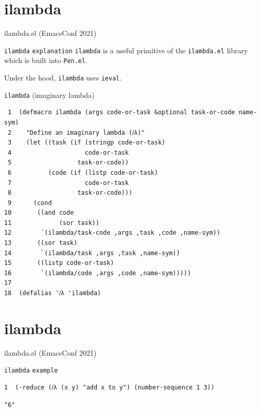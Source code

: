 \documentclass[presentation]{beamer}
\begin{document}
\section{ilambda}
\label{sec:org6a4a844}
\begin{frame}[label={sec:org9c6acbb},fragile]{ilambda.el (EmacsConf 2021)}
 \begin{block}{\texttt{ilambda} \texttt{explanation}}
\texttt{ilambda} is a useful primitive of the
\texttt{ilambda.el} library which is built into
\texttt{Pen.el}.

Under the hood, \texttt{ilambda} uses \texttt{ieval}.
\end{block}

\begin{block}{\texttt{ilambda} (imaginary lambda)}
{\tiny
\begin{verbatim}
 1  (defmacro ilambda (args code-or-task &optional task-or-code name-sym)
 2    "Define an imaginary lambda (𝑖λ)"
 3    (let ((task (if (stringp code-or-task)
 4                    code-or-task
 5                  task-or-code))
 6          (code (if (listp code-or-task)
 7                    code-or-task
 8                  task-or-code)))
 9      (cond
10       ((and code
11             (sor task))
12        `(ilambda/task-code ,args ,task ,code ,name-sym))
13       ((sor task)
14        `(ilambda/task ,args ,task ,name-sym))
15       ((listp code-or-task)
16        `(ilambda/code ,args ,code ,name-sym)))))
17  
18  (defalias '𝑖λ 'ilambda)
\end{verbatim}
}
\end{block}
\end{frame}

\section{ilambda}
\label{sec:org67d0855}
\begin{frame}[label={sec:org7ab8f77},fragile]{ilambda.el (EmacsConf 2021)}
 \begin{block}{\texttt{ilambda} \texttt{example}}
{\tiny
\begin{verbatim}
1  (-reduce (𝑖λ (x y) "add x to y") (number-sequence 1 3))
\end{verbatim}
}

{\tiny
\begin{verbatim}
"6"
\end{verbatim}
}
\end{block}
\end{frame}
\end{document}

